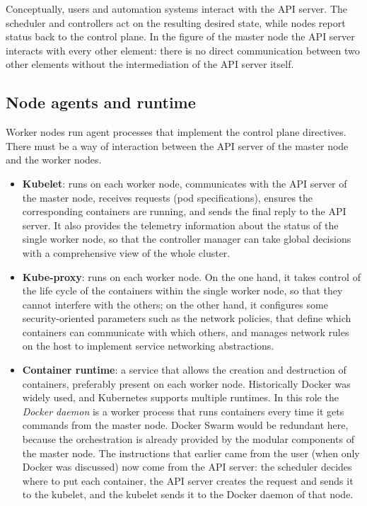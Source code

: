 \begin{center}
\end{center}

Conceptually, users and automation systems interact with the API server. The scheduler and controllers act on the resulting desired state, while nodes report status back to the control plane. In the figure of the master node the API server interacts with every other element: there is no direct communication between two other elements without the intermediation of the API server itself.

\subsection{Node agents and runtime}

Worker nodes run agent processes that implement the control plane directives. There must be a way of interaction between the API server of the master node and the worker nodes.

\begin{itemize}
\item \textbf{Kubelet}: runs on each worker node, communicates with the API server of the master node, receives requests (pod specifications), ensures the corresponding containers are running, and sends the final reply to the API server. It also provides the telemetry information about the status of the single worker node, so that the controller manager can take global decisions with a comprehensive view of the whole cluster.
\item \textbf{Kube-proxy}: runs on each worker node. On the one hand, it takes control of the life cycle of the containers within the single worker node, so that they cannot interfere with the others; on the other hand, it configures some security-oriented parameters such as the network policies, that define which containers can communicate with which others, and manages network rules on the host to implement service networking abstractions.
\item \textbf{Container runtime}: a service that allows the creation and destruction of containers, preferably present on each worker node. Historically Docker was widely used, and Kubernetes supports multiple runtimes. In this role the \emph{Docker daemon} is a worker process that runs containers every time it gets commands from the master node. Docker Swarm would be redundant here, because the orchestration is already provided by the modular components of the master node. The instructions that earlier came from the user (when only Docker was discussed) now come from the API server: the scheduler decides where to put each container, the API server creates the request and sends it to the kubelet, and the kubelet sends it to the Docker daemon of that node.
\end{itemize}

